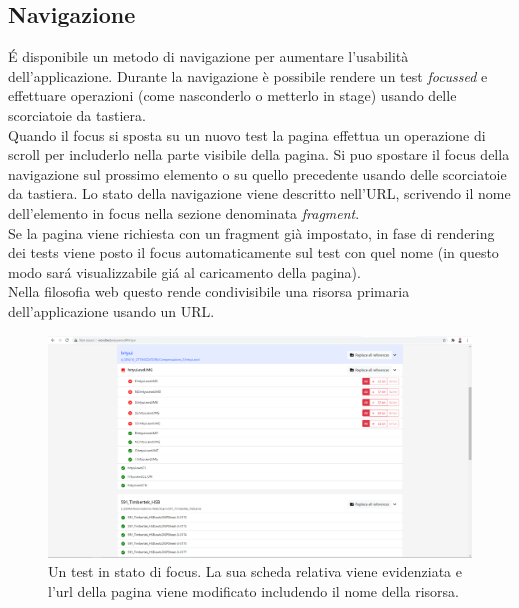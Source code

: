             \subsection{Navigazione}
            \'E  disponibile un metodo di navigazione per aumentare l'usabilità dell'applicazione.
            Durante la navigazione è possibile rendere un test \textit{focussed} e effettuare operazioni (come nasconderlo o metterlo in stage) usando delle scorciatoie da tastiera.\\
            Quando il focus si sposta su un nuovo test la pagina effettua un operazione di scroll per includerlo nella parte visibile della pagina.
            Si puo spostare il focus della navigazione sul prossimo elemento o su quello precedente usando delle scorciatoie da tastiera.
            Lo stato della navigazione viene descritto nell'URL, scrivendo il nome dell'elemento in focus nella sezione denominata \textit{fragment}.\\
            Se la pagina viene richiesta con un fragment già impostato, in fase di rendering dei tests viene posto il focus automaticamente sul test con quel nome (in questo modo sar\'a visualizzabile gi\'a al caricamento della pagina).\\
            Nella filosofia web questo rende condivisibile una risorsa primaria dell'applicazione usando un URL.
            
            \begin{figure}
                \includegraphics{images/active.png}
                \caption{Un test in stato di focus. La sua scheda relativa viene evidenziata e l'url della pagina viene modificato includendo il nome della risorsa.}
            \end{figure}
